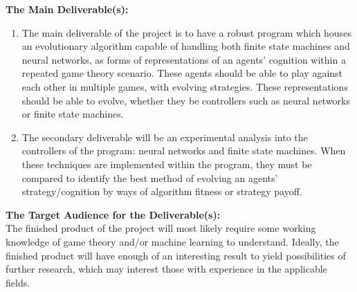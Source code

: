 \documentclass[12pt,a4paper]{article}
\begin{document}
\begin{appendices}
\textbf{The Main Deliverable(s):}
\begin{enumerate}
  \item The main deliverable of the project is to have a robust program which houses an evolutionary algorithm capable of handling both finite state machines and neural networks, as forms of representations of an agents’ cognition within a repeated game theory scenario. These agents should be able to play against each other in multiple games, with evolving strategies. These representations should be able to evolve, whether they be controllers such as neural networks or finite state machines.
  \item The secondary deliverable will be an experimental analysis into the controllers of the program: neural networks and finite state machines. When these techniques are implemented within the program, they must be compared to identify the best method of evolving an agents’ strategy/cognition by ways of algorithm fitness or strategy payoff. \\
\end{enumerate}

\textbf{The Target Audience for the Deliverable(s):} \\
\newline
The finished product of the project will most likely require some working knowledge of game theory and/or machine learning to understand. Ideally, the finished product will have enough of an interesting result to yield possibilities of further research, which may interest those with experience in the applicable fields. \\


\end{appendices}
\end{document}
